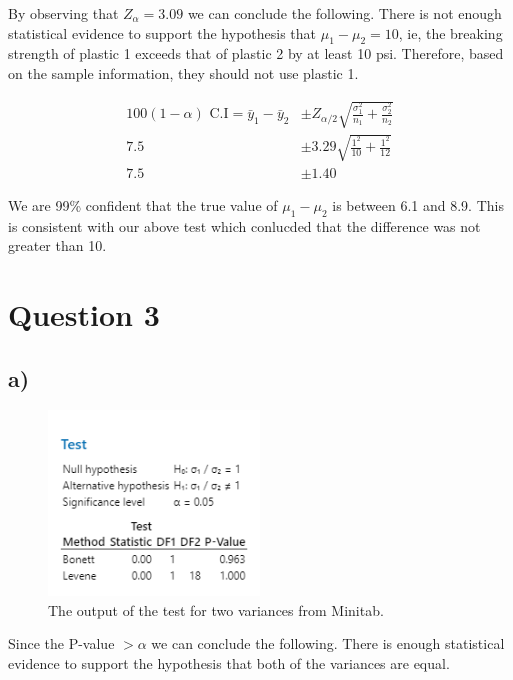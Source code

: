 \documentclass{article}
\begin{document}
By observing that $Z_{\alpha} = 3.09$ we can conclude the following.
There is not enough statistical evidence to support the hypothesis that $\mu_1 - \mu_2 = 10$,
ie, the breaking strength of plastic 1 exceeds that of plastic 2 by at least 10 psi.
Therefore, based on the sample information, they should not use plastic 1.

\begin{align*}
  100(1-\alpha) \text{ C.I} = \bar{y}_1 - \bar{y}_2&\pm Z_{\alpha/2} \sqrt{\frac{\sigma_1^2}{n_1} + \frac{\sigma_2^2}{n_2}} \\
  7.5                       &\pm 3.29 \sqrt{\frac{1^2}{10} + \frac{1^2}{12}} \\
  7.5                       &\pm 1.40
\end{align*}

We are 99\% confident that the true value of $\mu_1 - \mu_2$ is between 6.1 and 8.9.
This is consistent with our above test which conlucded that the difference was not greater than 10.
\section*{Question 3}

\subsection*{a)}
\begin{figure}[h]
    \centering
    \includegraphics[width=0.5\textwidth]{./images/3_a.png}
    \caption{The output of the test for two variances from Minitab.}
    \label{fig:3_a}
  \end{figure}
  Since the P-value $> \alpha$ we can conclude the following.
  There is enough statistical evidence to support the hypothesis that both of the variances are equal.
\end{document}
